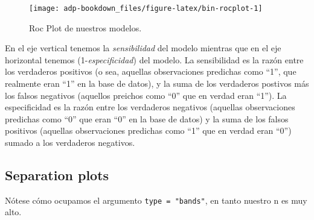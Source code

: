 \documentclass[]{book}
\newenvironment{Shaded}{\begin{snugshade}}{\end{snugshade}}
\newcommand{\KeywordTok}[1]{\textcolor[rgb]{0.13,0.29,0.53}{\textbf{#1}}}
\newcommand{\DataTypeTok}[1]{\textcolor[rgb]{0.13,0.29,0.53}{#1}}
\newcommand{\DecValTok}[1]{\textcolor[rgb]{0.00,0.00,0.81}{#1}}
\newcommand{\StringTok}[1]{\textcolor[rgb]{0.31,0.60,0.02}{#1}}
\newcommand{\OperatorTok}[1]{\textcolor[rgb]{0.81,0.36,0.00}{\textbf{#1}}}
\newcommand{\NormalTok}[1]{#1}
\begin{document}
\begin{figure}

{\centering \texttt{[image: adp-bookdown\_files/figure-latex/bin-rocplot-1]} 

}

\caption{Roc Plot de nuestros modelos.}\label{fig:bin-rocplot}
\end{figure}

En el eje vertical tenemos la \emph{sensibilidad} del modelo mientras
que en el eje horizontal tenemos (1-\emph{especificidad}) del modelo. La
sensibilidad es la razón entre los verdaderos positivos (o sea, aquellas
observaciones predichas como ``1'', que realmente eran ``1'' en la base
de datos), y la suma de los verdaderos postivos más los falsos negativos
(aquellos preichos como ``0'' que en verdad eran ``1''). La
especificidad es la razón entre los verdaderos negativos (aquellas
observaciones predichas como ``0'' que eran ``0'' en la base de datos) y
la suma de los falsos positivos (aquellas observaciones predichas como
``1'' que en verdad eran ``0'') sumado a los verdaderos negativos.

\subsection{Separation plots}\label{separation-plots}

Nótese cómo ocupamos el argumento \texttt{type\ =\ "bands"}, en tanto
nuestro n es muy alto.

\begin{Shaded}
\end{Shaded}
\end{document}
